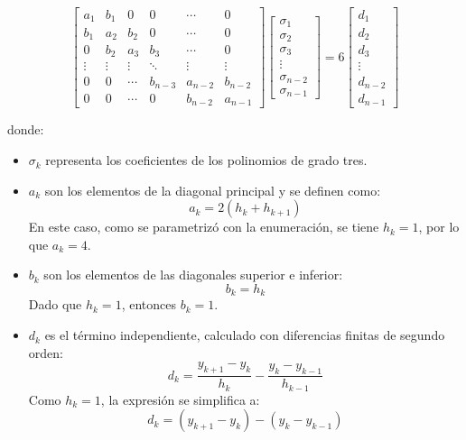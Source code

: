 \begin{homeworkProblem}
\begin{solucion}
\[
\begin{bmatrix}
    a_1 & b_1 & 0 & 0 & \cdots & 0 \\
    b_1 & a_2 & b_2 & 0 & \cdots & 0 \\
    0 & b_2 & a_3 & b_3 & \cdots & 0 \\
    \vdots & \vdots & \vdots & \ddots & \vdots & \vdots \\
    0 & 0 & \cdots & b_{n-3} & a_{n-2} & b_{n-2} \\
    0 & 0 & \cdots & 0 & b_{n-2} & a_{n-1}
\end{bmatrix}
\begin{bmatrix}
    \sigma_1 \\
    \sigma_2 \\
    \sigma_3 \\
    \vdots \\
    \sigma_{n-2} \\
    \sigma_{n-1}
\end{bmatrix}
=
6\begin{bmatrix}
    d_1 \\
    d_2 \\
    d_3 \\
    \vdots \\
    d_{n-2} \\
    d_{n-1}
\end{bmatrix}
\]

donde:

\begin{itemize}
    \item $\sigma_k$ representa los coeficientes de los polinomios de grado tres.
    \item $a_k$ son los elementos de la diagonal principal y se definen como:
    \[
        a_k = 2(h_k + h_{k+1})
    \]
    En este caso, como se parametrizó con la enumeración, se tiene $h_k = 1$, por lo que $a_k = 4$.
    
    \item $b_k$ son los elementos de las diagonales superior e inferior:
    \[
        b_k = h_k
    \]
    Dado que $h_k = 1$, entonces $b_k = 1$.
    
    \item $d_k$ es el término independiente, calculado con diferencias finitas de segundo orden:
    \[
        d_k = \frac{y_{k+1} - y_k}{h_k} - \frac{y_k - y_{k-1}}{h_{k-1}}
    \]
    Como $h_k = 1$, la expresión se simplifica a:
    \[
        d_k = (y_{k+1} - y_k) - (y_k - y_{k-1})
    \]
\end{itemize}


\end{solucion}
\end{homeworkProblem}
